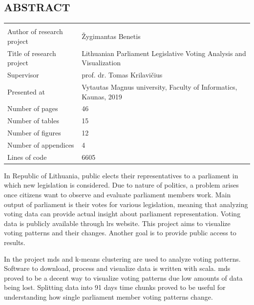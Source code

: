 \documentclass[a4paper,12pt]{article}
\begin{document}
	
	
	
	\begin{center}
		\section*{ABSTRACT}
	\end{center}
	
	
	
	\noindent
	\begin{center}
		\begin{tabular}{L{4.5cm} L{8cm}}
			\\ 
			Author of research project & Žygimantas Benetis \\
			Title of research project & Lithuanian Parliament Legislative Voting Analysis and Visualization\\
			Supervisor & prof. dr. Tomas Krilavičius\\
			Presented at & Vytautas Magnus university, Faculty of Informatics, Kaunas, 2019\\
			Number of pages & 46\\
			Number of tables & 15\\
			Number of figures & 12\\
			Number of appendices & 4\\
			Lines of code & 6605\\
		\end{tabular}
	\end{center} 
	
	\vspace{5mm}
	
	In Republic of Lithuania, public elects their representatives to a parliament in which new legislation is considered. Due to nature of politics, a problem arises once citizens want to observe and evaluate parliament members work. Main output of parliament is their votes for various legislation, meaning that analyzing voting data can provide actual insight about parliament representation. Voting data is publicly available through \gls{lrs} website. This project aims to visualize voting patterns and their changes. Another goal is to provide public access to results.
	
	In the project \gls{mds} \cite{BorgGroenen2005} and \gls{k-means} clustering are used to analyze voting patterns. Software to download, process and visualize  data is written with \gls{scala}. \Gls{mds} proved to be a decent way to visualize voting patterns due low amounts of data being lost. Splitting data into 91 days time chunks proved to be useful for understanding how single parliament member voting patterns change.
	
\end{document}

